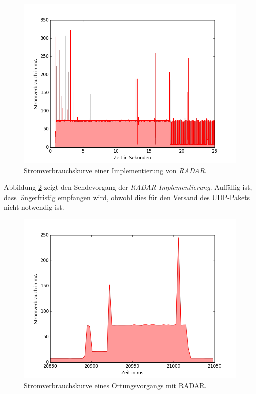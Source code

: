 \begin{figure}[h!]
  \centering
	\includegraphics[width=\textwidth]{plots/radar5s.png}
  \caption{Stromverbrauchskurve einer Implementierung von \emph{RADAR}.}
  \label{fig:radar5s}
\end{figure}

Abbildung \ref{fig:radar5ssend} zeigt den Sendevorgang der \emph{RADAR-Implementierung}.
Auffällig ist, dass längerfristig empfangen wird, obwohl dies für den Versand des UDP-Pakets nicht notwendig ist.

\begin{figure}[h!]
  \centering
	\includegraphics[width=\textwidth]{plots/radar5ssend.png}
  \caption{Stromverbrauchskurve eines Ortungsvorgangs mit RADAR.}
  \label{fig:radar5ssend}
\end{figure}

